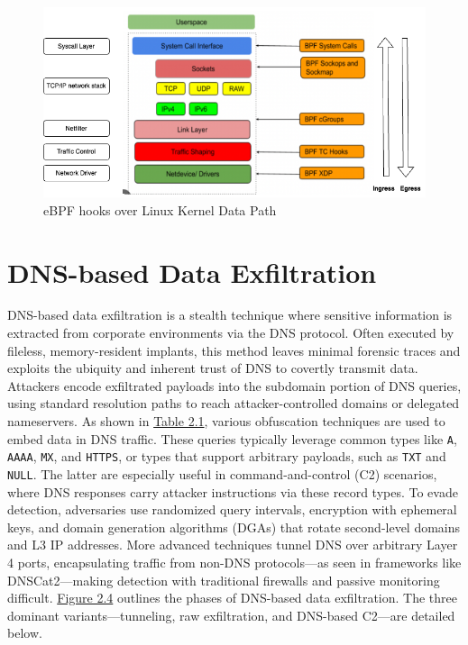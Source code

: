 \documentclass [11pt, proquest] {uwthesis}[2020/02/24]
\begin{document}




\begin{figure}
\includegraphics[width=1.0\textwidth]{images/kernel_datapath.png}
\caption{eBPF hooks over Linux Kernel Data Path}
\label{sec:ebpf-hooks-kernel-network-datapath}
\end{figure}


\section{DNS-based Data Exfiltration}
DNS-based data exfiltration is a stealth technique where sensitive information is extracted from corporate environments via the DNS protocol. Often executed by fileless, memory-resident implants, this method leaves minimal forensic traces and exploits the ubiquity and inherent trust of DNS to covertly transmit data. Attackers encode exfiltrated payloads into the subdomain portion of DNS queries, using standard resolution paths to reach attacker-controlled domains or delegated nameservers. As shown in \hyperref[dns_payload_obfuscation]{Table 2.1}, various obfuscation techniques are used to embed data in DNS traffic. These queries typically leverage common types like \texttt{A}, \texttt{AAAA}, \texttt{MX}, and \texttt{HTTPS}, or types that support arbitrary payloads, such as \texttt{TXT} and \texttt{NULL}. The latter are especially useful in command-and-control (C2) scenarios, where DNS responses carry attacker instructions via these record types. To evade detection, adversaries use randomized query intervals, encryption with ephemeral keys, and domain generation algorithms (DGAs) that rotate second-level domains and L3 IP addresses. More advanced techniques tunnel DNS over arbitrary Layer 4 ports, encapsulating traffic from non-DNS protocols—as seen in frameworks like DNSCat2—making detection with traditional firewalls and passive monitoring difficult.
\hyperref[sec:dns c2 flow]{Figure 2.4} outlines the phases of DNS-based data exfiltration. The three dominant variants—tunneling, raw exfiltration, and DNS-based C2—are detailed below.
\end{document}
